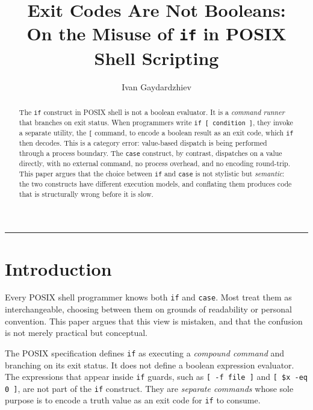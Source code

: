 \documentclass[11pt,a4paper]{article}
\begin{document}
\title{Exit Codes Are Not Booleans:\\[4pt]
\large On the Misuse of \texttt{if} in POSIX Shell Scripting}

\author{Ivan Gaydardzhiev}
\date{}

\maketitle

\begin{abstract}
\noindent
The \texttt{if} construct in POSIX shell is not a boolean evaluator.
It is a \emph{command runner} that branches on exit status.
When programmers write \texttt{if [ condition ]}, they invoke a
separate utility, the \texttt{[} command, to encode a boolean result
as an exit code, which \texttt{if} then decodes.
This is a category error: value-based dispatch is being performed
through a process boundary.
The \texttt{case} construct, by contrast, dispatches on a value
directly, with no external command, no process overhead, and no
encoding round-trip.
This paper argues that the choice between \texttt{if} and
\texttt{case} is not stylistic but \emph{semantic}: the two
constructs have different execution models, and conflating them
produces code that is structurally wrong before it is slow.
\end{abstract}

\vspace{6pt}
\noindent\rule{\linewidth}{0.4pt}
\vspace{4pt}

\section{Introduction}

Every POSIX shell programmer knows both \texttt{if} and \texttt{case}.
Most treat them as interchangeable, choosing between them on grounds
of readability or personal convention.
This paper argues that this view is mistaken, and that the confusion
is not merely practical but conceptual.

The POSIX specification defines \texttt{if} as executing a
\emph{compound command} and branching on its exit status.
It does not define a boolean expression evaluator.
The expressions that appear inside \texttt{if} guards,
such as \texttt{[ -f file ]} and \texttt{[ \$x -eq 0 ]},
are not part of the \texttt{if} construct.
They are \emph{separate commands} whose sole purpose is to encode a
truth value as an exit code for \texttt{if} to consume.
\end{document}

